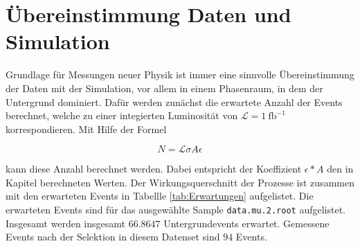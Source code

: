 \section{Übereinstimmung Daten und Simulation}
\label{sec:aufgabe6}

Grundlage für Messungen neuer Physik ist immer eine sinnvolle Übereinstimmung 
der Daten mit der Simulation, vor allem in einem Phasenraum, in dem der 
Untergrund dominiert. Dafür werden zunächst die erwartete Anzahl der Events 
berechnet, welche zu einer integierten Luminosität von 
$\mathcal{L} = \SI{1}{\femto\barn}^{-1}$ korrespondieren. Mit Hilfe der Formel 

\begin{equation}
N = \mathcal{L} \sigma A \epsilon
\label{eqn:erwartung}
\end{equation}

kann diese Anzahl berechnet werden. Dabei entspricht der Koeffizient 
$\epsilon * A$ den in Kapitel \label{sec:aufgabe3}
berechneten Werten. Der Wirkungsquerschnitt der Prozesse ist zusammen mit 
den erwarteten Events in Tabellle \ref{tab:Erwartungen} aufgelistet. Die erwarteten 
Events sind für das ausgewählte Sample \texttt{data.mu.2.root} aufgelistet. Insgesamt 
werden insgesamt $66.8647$ Untergrundevents erwartet. Gemessene Events nach der 
Selektion in diesem Datenset sind $94$ Events. 

